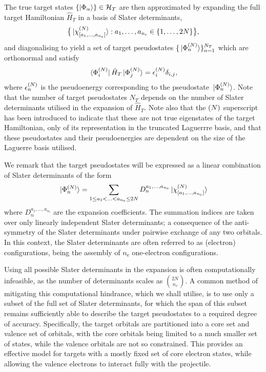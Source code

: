 \documentclass[]{article}
\begin{document}
The true target states
$\lbrace\ket{\Phi_{\alpha}}\rbrace \in \mathcal{H}_{T}$ are then
approximated by expanding the full target Hamiltonian $\hat{H}_{T}$ in a basis
of Slater determinants,
\begin{equation}
  \label{eq:target-slater-determinant-basis}
  \lrset[\big]
  {
    \ket*{\chi_{\lrsq{a_{1}, \dotsc, a_{n_{\mathrm{e}}}}}^{\lr{N}}}
    :
    a_{1}, \dotsc, a_{n_{\mathrm{e}}}
    \in
    \lrset{1, \dotsc, 2N}
  }
  ,
\end{equation}
and diagonalising to yield a set of target pseudostates
$\lbrace\ket*{\Phi_{n}^{(N)}}\rbrace_{n = 1}^{N_{T}}$ which are orthonormal and
satisfy
\begin{equation}
  \label{eq:target-states}
  \bra*{\Phi_{i}^{\lr{N}}}
  \hat{H}_{T}
  \ket*{\Phi_{j}^{\lr{N}}}
  =
  \epsilon_{i}^{\lr{N}}
  \delta_{i, j}
  ,
\end{equation}
where $\epsilon_{n}^{(N)}$ is the pseudoenergy corresponding to the
pseudostate $\ket*{\Phi_{n}^{(N)}}$.
Note that the number of target pseudostates $N_{T}$ depends on the number of
Slater determinants utilised in the expansion of $\hat{H}_{T}$.
Note also that the $(N)$ superscript has been introduced to indicate that
these are not true eigenstates of the target Hamiltonian, only of its
representation in the truncated Laguerrre basis, and that these pseudostates and
their pseudoenergies are dependent on the size of the Laguerre basis utilised.

We remark that the target pseudostates will be expressed as a linear combination
of Slater determinants of the form
\begin{equation}
  \label{eq:target-states-expansion}
  \ket*{\Phi_{n}^{\lr{N}}}
  =
  \sum_{1 \leq a_{1} < \dotsc < a_{n_{\mathrm{e}}} \leq 2N}
  D_{n}^{a_{1}, \dotsc, a_{n_{\mathrm{e}}}}
  \ket*{\chi_{\lrsq{a_{1}, \dotsc, a_{n_{\mathrm{e}}}}}^{\lr{N}}}
\end{equation}
where $D_{n}^{a_{1}, \dotsc, a_{n_{\mathrm{e}}}}$ are the expansion
coefficients.
The summation indices are taken over only linearly independent Slater
determinants; a consequence of the anti-symmetry of the Slater determinants
under pairwise exchange of any two orbitals.
In this context, the Slater determinants are often referred to as
(electron) configurations, being the assembly of $n_{\mathrm{e}}$ one-electron
configurations.

Using all possible Slater determinants in the expansion is often computationally
infeasible, as the number of determinants scales as
$\binom{2N}{n_{\mathrm{e}}}$.
A common method of mitigating this computational hindrance, which we shall
utilise, is to use only a subset of the full set of Slater determinants, for
which the span of this subset remains sufficiently able to describe the target
pseudostates to a required degree of accuracy.
Specifically, the target orbitals are partitioned into a core set and valence
set of orbitals, with the core orbitals being limited to a much smaller set of
states, while the valence orbitals are not so constrained.
This provides an effective model for targets with a mostly fixed set of core
electron states, while allowing the valence electrons to interact fully with the
projectile.
\end{document}
